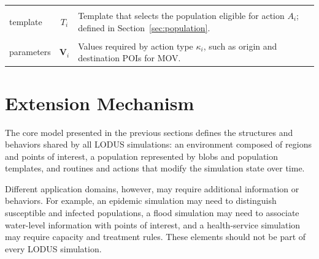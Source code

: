 \begin{table}[ht]
\begin{tabularx}{\linewidth}{@{}lcX@{}}
\begin{tabular}[c]{@{}l@{}}Population\\ template\end{tabular} & $T_i$ & Template that selects the population eligible for action $A_i$; defined in Section~\ref{sec:population}. \\ \midrule
\begin{tabular}[c]{@{}l@{}}Additional action\\ parameters\end{tabular} & $\bm{V}_i$ & Values required by action type $\kappa_i$, such as origin and destination POIs for MOV. \\ %
\bottomrule
\end{tabularx}
\end{table}



\FloatBarrier
\section{Extension Mechanism}
\label{sec:extension_mechanism}

The core model presented in the previous sections defines the structures and behaviors shared by all LODUS simulations: an environment composed of regions and points of interest, a population represented by blobs and population templates, and routines and actions that modify the simulation state over time.

Different application domains, however, may require additional information or behaviors. For example, an epidemic simulation may need to distinguish susceptible and infected populations, a flood simulation may need to associate water-level information with points of interest, and a health-service simulation may require capacity and treatment rules. These elements should not be part of every LODUS simulation.

